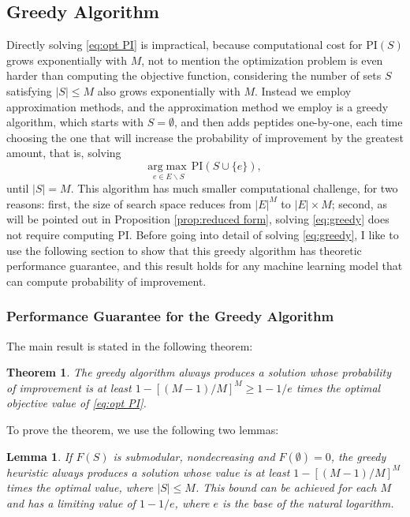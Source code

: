 \documentclass[11pt]{article}
\newcommand{\PI}{\text{PI}}
\newtheorem{theorem}{Theorem}
\newtheorem{lemma}{Lemma}
\begin{document}
\subsection{Greedy Algorithm} \label{sec:greedy algorithm}
Directly solving \eqref{eq:opt PI} is impractical, because computational cost for $\PI(S)$
grows exponentially with $M$, not to mention the optimization problem is even harder than
computing the objective function, considering the number of sets $S$ satisfying $|S| \leq M$
also grows exponentially with $M$. Instead we employ approximation methods, and the approximation
method we employ is a greedy algorithm, which starts with $S = \emptyset$, and then adds
peptides one-by-one, each time choosing the one that will increase the probability of 
improvement by the greatest amount, that is, solving 
\begin{equation}
  \underset{e \in E \backslash S}{\mathrm{arg}\max} \,\PI (S \cup \{e\}),
  \label{eq:greedy}
\end{equation}
until $|S| = M$. This algorithm has much smaller computational challenge, for two reasons:
first, the size of search space reduces from $|E|^M$ to $|E| \times M$; second, as will be pointed
out in Proposition \ref{prop:reduced form}, solving \eqref{eq:greedy} does not require computing $\PI$.
Before going into detail of solving \eqref{eq:greedy}, I like to use the following section
to show that this greedy algorithm has theoretic performance guarantee, and this result holds
for any machine learning model that can compute probability of improvement.

\subsubsection{Performance Guarantee for the Greedy Algorithm} \label{sec:lower bound}
The main result is stated in the following theorem:
\begin{theorem} 
  The greedy algorithm always produces a solution whose probability of improvement is at 
  least $1-[(M-1)/M]^M \geq 1 - 1 / e$ times the optimal objective
  value of \eqref{eq:opt PI}.
\end{theorem}
To prove the theorem, we use the following two lemmas:
\begin{lemma} \citep{nemhauser1978analysis}
  If $F(S)$ is submodular, nondecreasing and $F(\emptyset)=0$, the greedy heuristic always 
  produces a solution whose value is at least $1-[(M-1)/M]^M$ times the optimal value, where 
  $|S| \leq M$. This bound can be achieved for each $M$ and has a limiting value of $1-1/e$, 
  where $e$ is the base of the natural logarithm.
\end{lemma}
\end{document}

